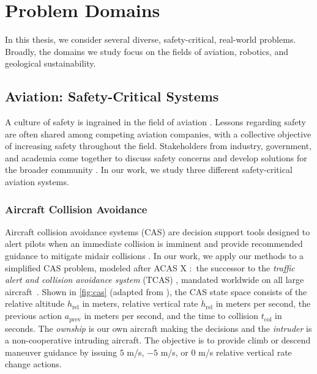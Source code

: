 \chapter{Problem Domains}\label{ch:problems}

In this thesis, we consider several diverse, safety-critical, real-world problems.
Broadly, the domains we study focus on the fields of aviation, robotics, and geological sustainability.

\section{Aviation: Safety-Critical Systems}
A culture of safety is ingrained in the field of aviation \cite{oster2013analyzing}.
Lessons regarding safety are often shared among competing aviation companies, with a collective objective of increasing safety throughout the field.
Stakeholders from industry, government, and academia come together to discuss safety concerns and develop solutions for the broader community \cite{do178c}.
In our work, we study three different safety-critical aviation systems.

\subsection{Aircraft Collision Avoidance}
Aircraft collision avoidance systems (CAS) are decision support tools designed to alert pilots when an immediate collision is imminent and provide recommended guidance to mitigate midair collisions \cite{kochenderfer2012next}.
In our work, we apply our methods to a simplified CAS problem, modeled after ACAS X \cite{do358a}:~the successor to the \textit{traffic alert and collision avoidance system} (TCAS) \cite{do185b}, mandated worldwide on all large aircraft~\cite{tcas2011introduction}.
Shown in \cref{fig:cas} (adapted from \textcite{dmbook}), the CAS state space consists of the relative altitude $h_\text{rel}$ in meters, relative vertical rate $\dot{h}_\text{rel}$ in meters per second, the previous action $a_\text{prev}$ in meters per second, and the time to collision $t_\text{col}$ in seconds.
The \textit{ownship} is our own aircraft making the decisions and the \textit{intruder} is a non-cooperative intruding aircraft.
The objective is to provide climb or descend maneuver guidance by issuing $5$ m/s, $-5$ m/s, or $0$ m/s relative vertical rate change actions.

